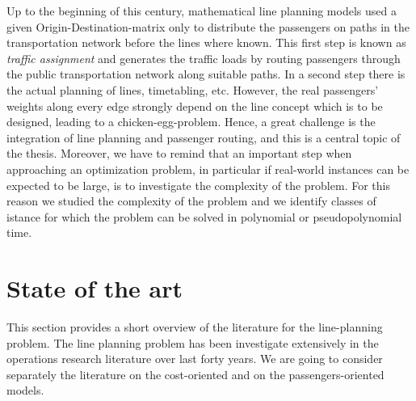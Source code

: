 \documentclass[
  twoside,
  11pt, a4paper,
  footinclude=true,
  headinclude=true,
  cleardoublepage=empty
]{book}
\theoremstyle{definition}
\begin{document}
Up to the beginning of this century, mathematical line planning models used a given Origin-Destination-matrix only to distribute the passengers on paths in the transportation network before the lines where known. This first step is known as \emph{traffic assignment} and generates the traffic loads by routing passengers through the public transportation network along suitable paths. In  a second step there is the actual planning of lines, timetabling, etc. \newline
However, the real passengers' weights along every edge strongly depend on the line concept which is to be designed, leading to a chicken-egg-problem. \newline
Hence, a great challenge is the integration of line planning and passenger routing, and this is a central topic of the thesis. \newline
Moreover, we have to remind that an important step when approaching an optimization problem, in particular if real-world instances can be expected to be large, is to investigate the complexity of the problem. For this reason we studied the complexity of the problem and we identify classes of istance  for which the problem can be solved in polynomial or pseudopolynomial time.



\chapter{State of the art}
This section provides a short overview of the literature  for the line-planning problem. The line planning problem has been investigate extensively in the operations research literature over last forty years. We are going to consider separately the literature on the cost-oriented and on the passengers-oriented models.
\end{document}
